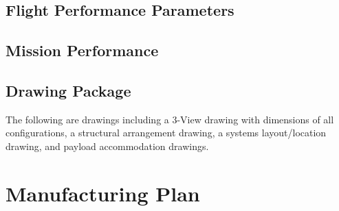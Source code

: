 \documentclass[report]{byu-aero}
\begin{document}
\subsection{Flight Performance Parameters}
\label{ssec:flightperformanceparams}




\subsection{Mission Performance}
\label{ssec:missionperformance}



 
\subsection{Drawing Package}
\label{ssec:drawings}

The following are drawings including a 3-View drawing with dimensions of all configurations, a structural arrangement drawing, a systems layout/location drawing, and payload accommodation drawings.









\section{Manufacturing Plan} %
\label{sec:ManufacturingPlan}
\end{document}
